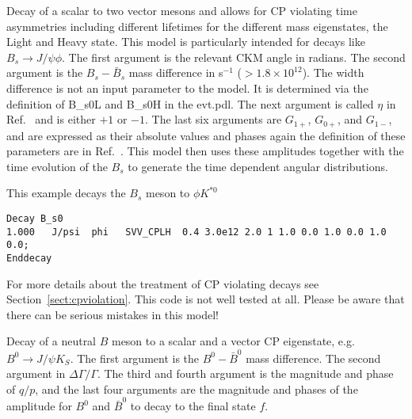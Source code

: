 
\label{svvcplh}



\Expl
Decay of a scalar to two vector mesons and allows for CP violating 
time asymmetries including different lifetimes for the different
mass eigenstates, the Light and Heavy state. This model is particularly
intended for decays like $B_s\rightarrow J/\psi \phi$. The first argument is 
the relevant CKM angle in radians. The second argument is the 
$B_s-\bar B_s$ mass difference
in s$^{-1}$ ($>1.8\times 10^{12}$). 
The width difference is not an input parameter to the model.
It is determined via the definition of B\_s0L and B\_s0H in the evt.pdl.
The next argument is called $\eta$ in Ref.~\cite{Duni91} and
is either $+1$ or $-1$. The last six arguments are $G_{1+}$,
$G_{0+}$, and $G_{1-}$, and are expressed as their absolute values
and phases again the definition of these parameters are in Ref.~\cite{Duni91}.
This model then uses these amplitudes 
together with the time evolution of the $B_s$ to generate the time
dependent angular distributions.


\Example
This example decays the $B_s$ meson to $\phi K^{*0}$
\begin{verbatim}
Decay B_s0
1.000   J/psi  phi   SVV_CPLH  0.4 3.0e12 2.0 1 1.0 0.0 1.0 0.0 1.0 0.0;
Enddecay
\end{verbatim}

\Notes
For more details about the treatment of CP violating decays 
see Section~\ref{sect:cpviolation}. This code is not well tested
at all. Please be aware that there can be serious mistakes in
this model!




\label{svscplh}



\Expl
Decay of a neutral $B$ meson to a scalar and a vector CP eigenstate,
e.g. $B^0\to J/\psi K_S$. The first argument is the $B^0-\bar B^0$ 
mass difference. The second argument in $\Delta\Gamma/\Gamma$. The 
third and fourth argument is the magnitude and phase of $q/p$, and the 
last four arguments are the magnitude and phases of the amplitude
for $B^0$ and $\bar B^0$ to decay to the final state $f$.



